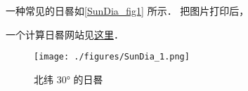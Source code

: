 

一种常见的日晷如\autoref{SunDia_fig1} 所示． 把图片打印后， 

一个计算日晷网站见\href{https://www.blocklayer.com/sundial.aspx}{这里}．
\begin{figure}[ht]
\centering
\texttt{[image: ./figures/SunDia\_1.png]}
\caption{北纬 30° 的日晷} \label{SunDia_fig1}
\end{figure}
